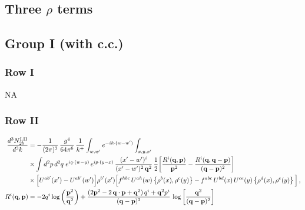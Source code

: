\documentclass[9pt]{article}
\numberwithin{equation}{section}
\begin{document}
\subsection*{Three $\rho$ terms}
\subsection{Group I (with c.c.)}
\subsubsection*{Row I} \textsc{NA}
\subsubsection*{Row II}
\begin{align}
\frac{d^{3}N^{\rm I.II}_{2b}}{d^{3}k} & = -\frac{1}{(2\pi)^{3}}\,\frac{g^{4}}{64\pi^{6}}\,\frac{1}{k^{+}}\int_{w,w'}e^{-ik\cdot(w-w')}\int_{x,y,x'}\notag\\
&\times\int d^{2}p\,d^{2}q\;e^{iq\cdot(w-y)}\,e^{ip\cdot(y-x)}\,\frac{(x'-w')^{i}}{(x'-w')^{2}\,\mathbf{q}^{2}}\,\frac{1}{2}\bigg[\frac{R^{i}(\mathbf{q},\mathbf{p})}{\mathbf{p}^{2}}-\frac{R^{i}(\mathbf{q},\mathbf{q}-\mathbf{p})}{(\mathbf{q}-\mathbf{p})^{2}}\bigg]\notag\\
&\times\Big[U^{ab'}(x')-U^{ab'}(w')\Big]\rho^{b'}(x')\Big[f^{hbc}\,U^{ah}(w)\left\{\rho^{b}(x),\rho^{c}(y)\right\}-f^{abc}\,U^{bd}(x)\,U^{ce}(y)\left\{\rho^{d}(x),\rho^{e}(y)\right\}\Big]\,,\label{eq:B-I2b}\\
R^{i}(\mathbf{q},\mathbf{p}) & = -2q^{i}\log\left(\frac{\mathbf{p}^{2}}{\mathbf{q}^{2}}\right)+\frac{(2\mathbf{p}^{2}-2\,\mathbf{q}\cdot\mathbf{p}+\mathbf{q}^{2})\,q^{i}+\mathbf{q}^{2}p^{i}}{(\mathbf{q}-\mathbf{p})^{2}}\,\log\left[\frac{\mathbf{q}^{2}}{(\mathbf{q}-\mathbf{p})^{2}}\right]
\end{align}
\end{document}
